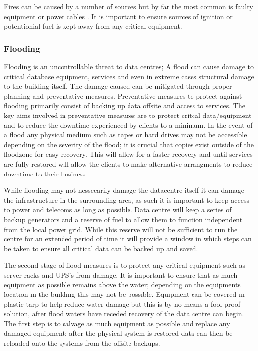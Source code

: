 \documentclass[11pt]{article}
\begin{document}
Fires can be caused by a number of sources but by far the most common is faulty equipment or power cables \cite{sean1}.  It is important to ensure sources of ignition or potentionial fuel is kept away from any critical equipment. 

\subsubsection{Flooding}
Flooding is an uncontrollable threat to data centres; A flood can cause damage to critical database equipment, services and even in extreme cases structural damage to the building itself. The damage caused can be mitigated through proper planning and preventative measures. Preventative measures to protect against flooding primarily consist of backing up data offsite and access to services.  The key aims involved in preventative measures are to protect critcal data/equipment and to reduce the downtime experienced by clients to a minimum.  In the event of a flood any physical medium such as tapes or hard drives may not be accessible depending on the severity of the flood; it is crucial that copies exist outside of the floodzone for easy recovery. This will allow for a faster recovery and until services are fully restored will allow the clients to make alternative arrangments to reduce downtime to their business.

While flooding may not nessecarily damage the datacentre itself it can damage the infrastructure in the surrounding area, as such it is important to keep access to power and telecoms as long as possible.  Data centre will keep a series of backup generators and a reserve of fuel to allow them to function independent from the local power grid.  While this reserve will not be sufficient to run the centre for an extended period of time it will provide a window in which steps can be taken to ensure all critical data can be backed up and saved.

The second stage of flood measures is to protect any critical equipment such as server racks and UPS's from damage.  It is important to ensure that as much equipment as possible remains above the water; depending on the equipments location in the building this may not be possible.  Equipment can be covered in plastic tarp to help reduce water damage but this is by no means a fool proof solution, after flood waters have receded recovery of the data centre can begin. The first step is to salvage as much equipment as possible and replace any damaged equipment; after the physical system is restored data can then be reloaded onto the systems from the offsite backups.
\end{document}
